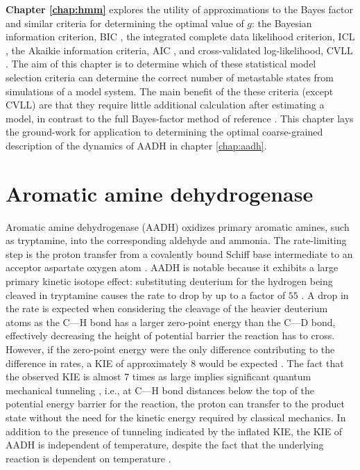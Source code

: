 \textbf{Chapter \ref{chap:hmm}} explores the utility of approximations to the Bayes factor and similar criteria for determining the optimal value of $g$: the Bayesian information criterion, BIC \cite{schwarzEstimatingDimensionModel1978a}, the integrated complete data likelihood criterion, ICL \cite{biernackiAssessingMixtureModel2000a}, the Akaikie information criteria, AIC \cite{akaikeInformationTheoryExtension1998}, and cross-validated log-likelihood, CVLL \cite{celeuxSelectingHiddenMarkov2008}. The aim of this chapter is to determine which of these statistical model selection criteria can determine the correct number of metastable states from simulations of  a model system. The main benefit of the these criteria (except CVLL) are that they require little additional calculation after estimating a model, in contrast to the full Bayes-factor method of reference \cite{bacalladoBayesianComparisonMarkov2009a}.  This chapter lays the ground-work for application to determining the optimal coarse-grained description of the dynamics of AADH in chapter \ref{chap:aadh}. 


\section{Aromatic amine dehydrogenase}

Aromatic amine dehydrogenase (AADH) oxidizes primary aromatic amines, such as tryptamine, into the corresponding aldehyde and ammonia. The rate-limiting step is the proton transfer from a covalently bound Schiff base intermediate to an acceptor aspartate oxygen atom \cite{masgrauAtomicDescriptionEnzyme2006}.  AADH is notable because it exhibits a large primary kinetic isotope effect: substituting deuterium for the hydrogen being cleaved in tryptamine causes the rate to drop by up to a factor of $55$ \cite{masgrauAtomicDescriptionEnzyme2006}.  A drop in the rate is expected when considering the cleavage of the heavier deuterium atoms as the C---H bond has a larger zero-point energy than the C---D bond, effectively decreasing the height of potential barrier the reaction has to cross. However, if the zero-point energy were the only difference contributing to the difference in rates, a KIE of approximately \num{8} would be expected \cite{antoniouLargeKineticIsotope1997}.  The fact that the observed KIE is almost \num{7} times as large implies significant quantum mechanical tunneling \cite{masgrauAtomicDescriptionEnzyme2006, klinmanbeyond2009, basranImportanceBarrierShape2001a}, i.e., at C---H bond distances below the top of the potential energy barrier for the reaction, the proton can transfer to the product state without the need for the kinetic energy required by classical mechanics.  In addition to the presence of tunneling indicated by the inflated KIE, the KIE of AADH is independent of temperature, despite the fact that the underlying reaction is dependent on temperature \cite{masgrauAtomicDescriptionEnzyme2006}. 


